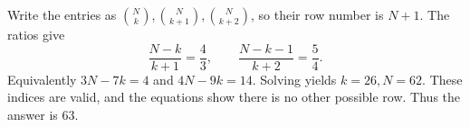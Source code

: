 Write the entries as $\binom Nk,\binom N{k+1},\binom N{k+2}$, so their row number is $N+1$. The ratios give
\[
\dfrac{N-k}{k+1}=\dfrac{4}{3},\qquad
\dfrac{N-k-1}{k+2}=\dfrac{5}{4}.
\]
Equivalently $3N-7k=4$ and $4N-9k=14$. Solving yields $k=26,N=62$. These indices are valid, and the equations show there is no other possible row. Thus the answer is $\boxed{63}$.
